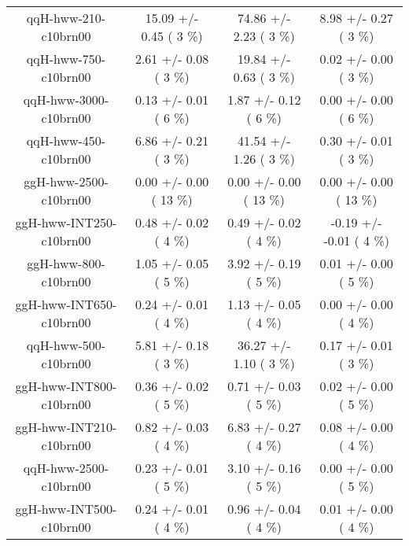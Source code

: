 \begin{table}[h!]
\begin{center}
{\begin{tabular}{
c| c | c | c | }
 qqH-hww-210-c10brn00   &      15.09 +/-       0.45 (         3 \%)   &      74.86 +/-       2.23 (         3 \%)   &       8.98 +/-       0.27 (         3 \%)  \\
 qqH-hww-750-c10brn00   &       2.61 +/-       0.08 (         3 \%)   &      19.84 +/-       0.63 (         3 \%)   &       0.02 +/-       0.00 (         3 \%)  \\
 qqH-hww-3000-c10brn00   &       0.13 +/-       0.01 (         6 \%)   &       1.87 +/-       0.12 (         6 \%)   &       0.00 +/-       0.00 (         6 \%)  \\
 qqH-hww-450-c10brn00   &       6.86 +/-       0.21 (         3 \%)   &      41.54 +/-       1.26 (         3 \%)   &       0.30 +/-       0.01 (         3 \%)  \\
 ggH-hww-2500-c10brn00   &       0.00 +/-       0.00 (        13 \%)   &       0.00 +/-       0.00 (        13 \%)   &       0.00 +/-       0.00 (        13 \%)  \\
 ggH-hww-INT250-c10brn00   &       0.48 +/-       0.02 (         4 \%)   &       0.49 +/-       0.02 (         4 \%)   &      -0.19 +/-      -0.01 (         4 \%)  \\
 ggH-hww-800-c10brn00   &       1.05 +/-       0.05 (         5 \%)   &       3.92 +/-       0.19 (         5 \%)   &       0.01 +/-       0.00 (         5 \%)  \\
 ggH-hww-INT650-c10brn00   &       0.24 +/-       0.01 (         4 \%)   &       1.13 +/-       0.05 (         4 \%)   &       0.00 +/-       0.00 (         4 \%)  \\
 qqH-hww-500-c10brn00   &       5.81 +/-       0.18 (         3 \%)   &      36.27 +/-       1.10 (         3 \%)   &       0.17 +/-       0.01 (         3 \%)  \\
 ggH-hww-INT800-c10brn00   &       0.36 +/-       0.02 (         5 \%)   &       0.71 +/-       0.03 (         5 \%)   &       0.02 +/-       0.00 (         5 \%)  \\
 ggH-hww-INT210-c10brn00   &       0.82 +/-       0.03 (         4 \%)   &       6.83 +/-       0.27 (         4 \%)   &       0.08 +/-       0.00 (         4 \%)  \\
 qqH-hww-2500-c10brn00   &       0.23 +/-       0.01 (         5 \%)   &       3.10 +/-       0.16 (         5 \%)   &       0.00 +/-       0.00 (         5 \%)  \\
 ggH-hww-INT500-c10brn00   &       0.24 +/-       0.01 (         4 \%)   &       0.96 +/-       0.04 (         4 \%)   &       0.01 +/-       0.00 (         4 \%)  \\

\end{tabular}}
\end{center}
\end{table}
